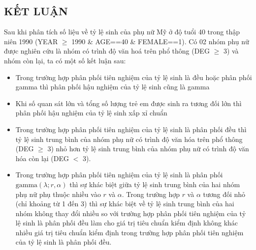 \documentclass[14pt, a4paper]{article}
\theoremstyle{sltheorem}
\theoremstyle{soltheorem}
\begin{document}
\newpage
\begin{center}
    \section*{KẾT LUẬN}
\end{center}

Sau khi phân tích số liệu về tỷ lệ sinh của phụ nữ Mỹ ở độ tuổi 40 trong thập niên 1990 (YEAR $\geq$ 1990 \& AGE==40 \& FEMALE==1).
Có 02 nhóm phụ nữ được nghiên cứu là nhóm có trình độ văn hoá trên phổ thông (DEG $\geq$ 3) và nhóm còn lại, ta có một số kết luận sau:

\begin{itemize}
    \item Trong trường hợp phân phối tiên nghiệm của tỷ lệ sinh là đều hoặc phân phối gamma thì phân phối hậu nghiệm của tỷ lệ sinh cũng là gamma
    \item Khi số quan sát lớn và tổng số lượng trẻ em được sinh ra tương đối lớn thì phân phối hậu nghiệm của tỷ lệ sinh xấp xỉ chuẩn
    \item Trong trường hợp phân phối tiên nghiệm của tỷ lệ sinh là phân phối đều thì tỷ lệ sinh trung bình của nhóm phụ nữ có trình độ văn hóa trên phổ thông (DEG $\geq$ 3) nhỏ hơn tỷ lệ sinh trung bình của nhóm phụ nữ có trình độ văn hóa còn lại (DEG $<$ 3).
    \item Trong trường hợp phân phối tiên nghiệm của tỷ lệ sinh là phân phối $\text{gamma}(\lambda; r, \alpha)$ thì sự khác biệt giữa tỷ lệ sinh trung bình của hai nhóm phụ nữ phụ thuộc nhiều vào $r$ và $\alpha$.
    Trong trường hợp $r$ và $\alpha$ tương đối nhỏ (chỉ khoảng từ 1 đến 3) thì sự khác biệt về tỷ lệ sinh trung bình của hai nhóm không thay đổi nhiều so với trường hợp phân phối tiên nghiệm của tỷ lệ sinh là phân phối đều làm cho giá trị tiêu chuẩn kiểm định không khác nhiều giá trị tiêu chuẩn kiểm định trong trường hợp phân phối tiên nghiệm của tỷ lệ sinh là phân phối đều.
    
\end{itemize}

\newpage
\printbibliography[title={TÀI LIỆU THAM KHẢO}]
\end{document}

